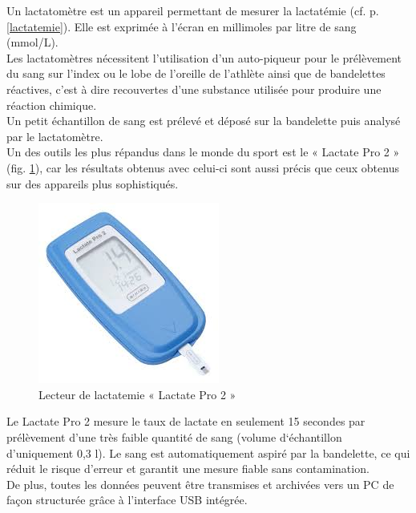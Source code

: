     Un lactatomètre est un appareil permettant de mesurer la lactatémie (cf. p.\pageref{lactatemie}  \ref{lactatemie}). Elle est exprimée à l'écran en millimoles par litre de sang (mmol/L).\\
    
    Les lactatomètres nécessitent l'utilisation d'un auto-piqueur pour le prélèvement du sang sur l'index ou le lobe de l'oreille de l'athlète ainsi que de bandelettes réactives, c'est à dire recouvertes d'une substance utilisée pour produire une réaction chimique. \\
    
    Un petit échantillon de sang est prélevé et déposé sur la bandelette puis analysé par le lactatomètre.\\

    Un des outils les plus répandus dans le monde du sport est le « Lactate Pro 2 » (fig. \ref{fig:lactatePro2}), car les résultats obtenus avec celui-ci sont aussi précis que ceux obtenus sur des appareils plus sophistiqués. 
    
     \begin{figure}[H]
        \centering
        \includegraphics[scale=0.6]{images/lactatePro.jpg}
        \caption{\label{fig:lactatePro2}Lecteur de lactatemie « Lactate Pro 2 »}
    \end{figure}
    
    Le Lactate Pro 2 mesure le taux de lactate en seulement 15 secondes par prélèvement d'une très faible quantité de sang (volume d‘échantillon d'uniquement 0,3 \si{\micro}l). Le sang est automatiquement aspiré par la bandelette, ce qui réduit le risque d'erreur et garantit une mesure fiable sans contamination. \\
        
    De plus, toutes les données peuvent être transmises et archivées vers un PC de façon structurée grâce à l'interface USB intégrée. \\
    
